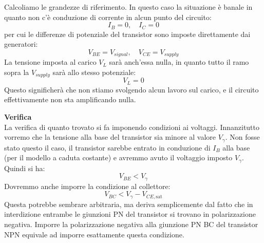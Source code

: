 \documentclass[a4paper,11pt]{article}
\begin{document}
Calcoliamo le grandezze di riferimento. In questo caso la situazione è banale in quanto non c'è conduzione di corrente in alcun punto del circuito:
$$
I_B = 0, \quad I_C = 0
$$
per cui le differenze di potenziale del transistor sono imposte direttamente dai generatori:
$$
V_{BE} = V_{signal}, \quad V_{CE} = V_{supply}
$$
La tensione imposta al carico $V_L$ sarà anch'essa nulla, in quanto tutto il ramo sopra la $V_{supply}$ sarà allo stesso potenziale:
$$
V_L = 0
$$
Questo significherà che non stiamo svolgendo alcun lavoro sul carico, e il circuito effettivamente non sta amplificando nulla. 

\par\smallskip
\noindent
\textbf{\textsf{Verifica}} \\
\noindent
La verifica di quanto trovato si fa imponendo condizioni ai voltaggi. Innanzitutto vorremo che la tensione alla base del transistor sia minore al valore $V_\gamma$. Non fosse stato questo il caso, il transistor sarebbe entrato in conduzione di $I_B$ alla base (per il modello a caduta costante) e avremmo avuto il voltaggio imposto $V_\gamma$. Quindi si ha:
$$
V_{BE} < V_\gamma
$$
Dovremmo anche imporre la condizione al collettore:
$$
V_{BC} < V_\gamma - V_{CE,\mathrm{sat}}
$$
Questa potrebbe sembrare arbitraria, ma deriva semplicemente dal fatto che in interdizione entrambe le giunzioni PN del transistor si trovano in polarizzazione negativa. Imporre la polarizzazione negativa alla giunzione PN BC del transistor NPN equivale ad imporre esattamente questa condizione.

\newpage
\end{document}
